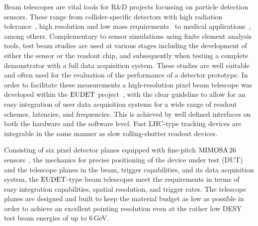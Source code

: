 
Beam telescopes are vital tools for R\&D projects focussing on particle detection sensors. 
These range from collider-specific detectors with high radiation tolerance~\cite{1748-0221-9-12-C12001,1748-0221-9-12-C12029},
 high resolution and low mass requirements~\cite{1748-0221-10-03-C03044} to medical applications~\cite{Ballabriga2011S15}, among others. 
Complementary to sensor simulations using finite element analysis tools, test beam studies are used at various stages including the development of either the sensor or the readout chip,
 and subsequently when testing a complete demonstrator with a full data acquisition system. 
These studies are well suitable and often used for the evaluation of the performance of a detector prototype. %
In order to facilitate these measurements a high-resolution pixel beam telescope was developed within the $\textrm{EUDET}$ project~\cite{ref:eudetreport200902},
 with the clear guideline to allow for an easy integration of user data acquisition systems for a wide range of readout schemes, latencies, and frequencies. 
This is achieved by well defined interfaces on both the hardware and the software level. 
Fast LHC-type tracking devices are integrable in the same manner as slow rolling-shutter readout devices. 

Consisting of six pixel detector planes equipped with fine-pitch $\textrm{MIMOSA\,26}$ sensors~\cite{HuGuo2010480},
 the mechanics for precise positioning of the device under test (DUT) and the telescope planes in the beam, trigger capabilities, and its data acquisition system, 
 the $\textrm{EUDET}$-type beam telescopes meet the requirements in terms of easy integration capabilities, spatial resolution, and trigger rates. 
The telescope planes are designed and built to keep the material budget as low as possible in order to achieve an excellent pointing resolution
 even at the rather low DESY test beam energies of up to 6\,GeV.

